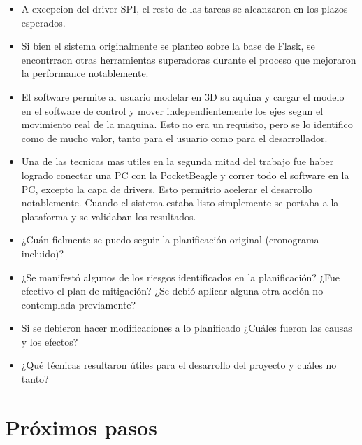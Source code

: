 \begin{itemize}
   \item{A excepcion del driver SPI, el resto de las tareas se alcanzaron en los plazos esperados.}

   \item{Si bien el sistema originalmente se planteo sobre la base de Flask, se encontrraon otras herramientas superadoras durante el proceso que mejoraron la performance notablemente.}

   \item{El software permite al usuario modelar en 3D su aquina y cargar el modelo en el software de control y mover independientemente los ejes segun el movimiento real de la maquina. Esto no era un requisito, pero se lo identifico como de mucho valor, tanto para el usuario como para el desarrollador.}

   \item{Una de las tecnicas mas utiles en la segunda mitad del trabajo fue haber logrado conectar una PC con la PocketBeagle y correr todo el software en la PC, excepto la capa de drivers. Esto permitrio acelerar el desarrollo notablemente. Cuando el sistema estaba listo simplemente se portaba a la plataforma y se validaban los resultados.}


\item ¿Cuán fielmente se puedo seguir la planificación original (cronograma incluido)?
\item ¿Se manifestó algunos de los riesgos identificados en la planificación? ¿Fue efectivo el plan de mitigación? ¿Se debió aplicar alguna otra acción no contemplada previamente?
\item Si se debieron hacer modificaciones a lo planificado ¿Cuáles fueron las causas y los efectos?
\item ¿Qué técnicas resultaron útiles para el desarrollo del proyecto y cuáles no tanto?
\end{itemize}


\section{Próximos pasos}

